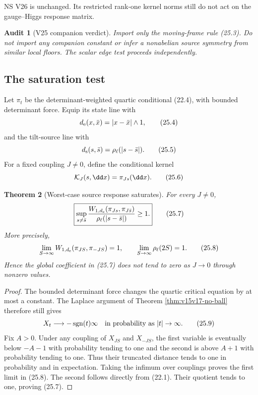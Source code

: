 \documentclass[11pt]{article}
\newtheorem{theorem}{Theorem}[section]
\newtheorem{audit}[theorem]{Audit}
\theoremstyle{remark}
\begin{document}
NS V26 is unchanged.  Its restricted rank-one kernel norms still
do not act on the gauge--Higgs response matrix.

\begin{audit}[V25 companion verdict]
\label{aud:v15v25-verdict}
Import only the moving-frame rule (25.3).  Do not import any
companion constant or infer a nonabelian source symmetry from
similar local floors.  The scalar edge test proceeds independently.
\end{audit}

\subsection{The saturation test}

Let \(\pi_t\) be the determinant-weighted quartic conditional
(22.4), with bounded determinant force.  Equip its state line with
\[
 d_{\rm e}(x,\bar x)=|x-\bar x|\wedge1,                     \tag{25.4}
\]
and the tilt-source line with
\[
 d_{\rm s}(s,\bar s)=\rho_\ell(|s-\bar s|).                 \tag{25.5}
\]
For a fixed coupling \(J\ne0\), define the conditional kernel
\[
 {\cal K}_J(s,\dd x)=\pi_{Js}(\dd x).                       \tag{25.6}
\]

\begin{theorem}[Worst-case source response saturates]
\label{thm:v15v25-saturation}
For every \(J\ne0\),
\[
 \boxed{
 \sup_{s\ne\bar s}
 \frac{
 W_{1,d_{\rm e}}(\pi_{Js},\pi_{J\bar s})
 }{
 \rho_\ell(|s-\bar s|)
 }
 \ge1.}                                                     \tag{25.7}
\]
More precisely,
\[
 \lim_{S\to\infty}
 W_{1,d_{\rm e}}(\pi_{JS},\pi_{-JS})=1,\qquad
 \lim_{S\to\infty}\rho_\ell(2S)=1.                         \tag{25.8}
\]
Hence the global coefficient in (25.7) does not tend to zero as
\(J\to0\) through nonzero values.
\end{theorem}

\begin{proof}
The bounded determinant force changes the quartic critical equation
by at most a constant.  The Laplace argument of Theorem
\ref{thm:v15v17-no-ball} therefore still gives
\[
 X_t\longrightarrow-\operatorname{sgn}(t)\infty
 \quad\hbox{in probability as }|t|\to\infty.                \tag{25.9}
\]
Fix \(A>0\).  Under any coupling of
\(X_{JS}\) and \(X_{-JS}\), the first variable is eventually below
\(-A-1\) with probability tending to one and the second is above
\(A+1\) with probability tending to one.  Thus their truncated
distance tends to one in probability and in expectation.  Taking
the infimum over couplings proves the first limit in (25.8).  The
second follows directly from (22.1).  Their quotient tends to one,
proving (25.7).
\end{proof}
\end{document}
